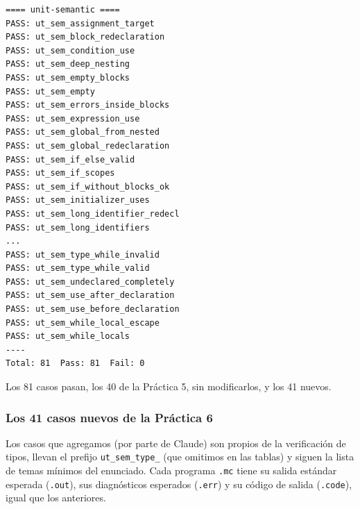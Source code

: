 \documentclass[12pt,letterpaper]{article}
\begin{document}
\begin{verbatim}
==== unit-semantic ====
PASS: ut_sem_assignment_target
PASS: ut_sem_block_redeclaration
PASS: ut_sem_condition_use
PASS: ut_sem_deep_nesting
PASS: ut_sem_empty_blocks
PASS: ut_sem_empty
PASS: ut_sem_errors_inside_blocks
PASS: ut_sem_expression_use
PASS: ut_sem_global_from_nested
PASS: ut_sem_global_redeclaration
PASS: ut_sem_if_else_valid
PASS: ut_sem_if_scopes
PASS: ut_sem_if_without_blocks_ok
PASS: ut_sem_initializer_uses
PASS: ut_sem_long_identifier_redecl
PASS: ut_sem_long_identifiers
...
PASS: ut_sem_type_while_invalid
PASS: ut_sem_type_while_valid
PASS: ut_sem_undeclared_completely
PASS: ut_sem_use_after_declaration
PASS: ut_sem_use_before_declaration
PASS: ut_sem_while_local_escape
PASS: ut_sem_while_locals
----
Total: 81  Pass: 81  Fail: 0
\end{verbatim}

Los 81 casos pasan, los 40 de la Práctica 5, sin modificarlos, y los 41 nuevos.

\subsubsection*{Los 41 casos nuevos de la Práctica 6}

Los casos que agregamos (por parte de Claude) son propios de la verificación de tipos, llevan el prefijo
\texttt{ut\_sem\_type\_} (que omitimos en las tablas) y siguen la lista de temas mínimos del enunciado. Cada
programa \texttt{.mc} tiene su salida estándar esperada (\texttt{.out}), sus diagnósticos esperados
(\texttt{.err}) y su código de salida (\texttt{.code}), igual que los anteriores.
\end{document}

